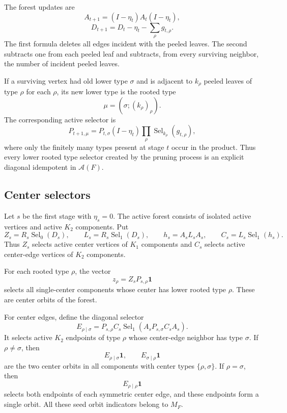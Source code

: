 \documentclass[a4paper,fleqn]{cas-sc}
\theoremstyle{definition}
\theoremstyle{remark}
\newcommand{\one}{\mathbf 1}
\newcommand{\Aalg}{\mathcal A}
\newcommand{\Sel}{\operatorname{Sel}}
\begin{document}
The forest updates are
\[
        A_{t+1}=(I-\eta_t)A_t(I-\eta_t),
\]
\[
        D_{t+1}=D_t-\eta_t-\sum_\rho g_{t,\rho}.
\]
The first formula deletes all edges incident with the peeled leaves.  The second
subtracts one from each peeled leaf and subtracts, from every surviving neighbor,
the number of incident peeled leaves.

If a surviving vertex had old lower type \(\sigma\) and is adjacent to
\(k_\rho\) peeled leaves of type \(\rho\) for each \(\rho\), its new lower type is the
rooted type
\[
        \mu=(\sigma;(k_\rho)_\rho).
\]
The corresponding active selector is
\[
        P_{t+1,\mu}
        =
        P_{t,\sigma}(I-\eta_t)
        \prod_\rho \Sel_{k_\rho}(g_{t,\rho}),
\]
where only the finitely many types present at stage \(t\) occur in the product.
Thus every lower rooted type selector created by the pruning process is an
explicit diagonal idempotent in \(\Aalg(F)\).

\subsection{Center selectors}
\label{subsec:center-selectors}

Let \(s\) be the first stage with \(\eta_s=0\).  The active forest consists of
isolated active vertices and active \(K_2\) components.  Put
\[
        Z_s=R_s\Sel_0(D_s),
        \qquad
        L_s=R_s\Sel_1(D_s),
        \qquad
        h_s=A_sL_sA_s,
        \qquad
        C_s=L_s\Sel_1(h_s).
\]
Thus \(Z_s\) selects active center vertices of \(K_1\) components and \(C_s\) selects
active center-edge vertices of \(K_2\) components.

For each rooted type \(\rho\), the vector
\[
        z_\rho=Z_sP_{s,\rho}\one
\]
selects all single-center components whose center has lower rooted type \(\rho\).
These are center orbits of the forest.

For center edges, define the diagonal selector
\[
        E_{\rho\mid\sigma}
        =
        P_{s,\rho}C_s\Sel_1(A_sP_{s,\sigma}C_sA_s).
\]
It selects active \(K_2\) endpoints of type \(\rho\) whose center-edge neighbor has
type \(\sigma\).  If \(\rho\ne\sigma\), then
\[
        E_{\rho\mid\sigma}\one,
        \qquad
        E_{\sigma\mid\rho}\one
\]
are the two center orbits in all components with center types \(\{\rho,\sigma\}\).
If \(\rho=\sigma\), then
\[
        E_{\rho\mid\rho}\one
\]
selects both endpoints of each symmetric center edge, and these endpoints form a
single orbit.  All these seed orbit indicators belong to \(M_F\).
\end{document}
